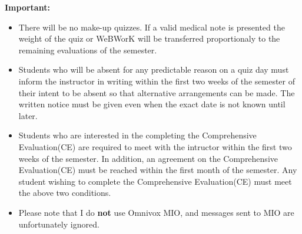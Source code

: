 \documentclass[12pt]{article}
\begin{document}
\textbf{Important:}
\begin{itemize}
\item There will be no make-up quizzes.  
If a valid medical note is presented the weight of the quiz or WeBWorK will be transferred proportionaly to the remaining evaluations of the semester.
\item Students who will be absent for any predictable reason on a quiz day
must inform the instructor in writing within the first two weeks of the 
semester of their intent to be absent so that alternative 
arrangements can be made. The written notice must be given 
even when the exact date is not known until later.
\item Students who are interested in the completing the Comprehensive Evaluation(CE) are required to meet with the intructor 
within the first two weeks of the semester.  In addition, an agreement on the Comprehensive Evaluation(CE) must be reached within the 
first month of the semester.  Any student wishing to complete the Comprehensive Evaluation(CE) must meet the above two conditions.
\item Please note that I do \textbf{not} use Omnivox MIO, and messages sent to MIO are unfortunately ignored.
\end{itemize}
\end{document}
